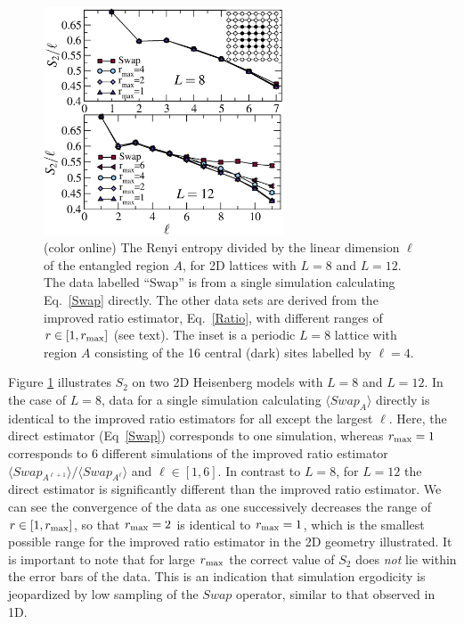 \documentclass[prl,aps,twocolumn,floatfix,amsmath,amssymb,superscriptaddress,tightenlines]{revtex4}
\begin{document}
\begin{figure} {
\includegraphics[width=2.8in]{L8n12_ratio.eps} \caption{(color online) 
\label{L16fig}
The Renyi entropy divided by the linear dimension $\ell$ of the entangled region $A$, for 2D lattices with $L=8$ and $L=12$.  The data labelled ``Swap'' is from a single simulation calculating Eq.~\eqref{Swap} directly.  The other
data sets are derived from the improved ratio estimator, Eq.~\eqref{Ratio}, with different ranges of $r \in [1,r_{\rm max}]$ (see text).  The inset 
is a periodic $L=8$ lattice with region $A$ consisting of the 16 central (dark) sites labelled by $\ell = 4$.
}
} \end{figure}

Figure \ref{L16fig} illustrates $S_2$ on two 2D Heisenberg models with  $L=8$ and  $L=12$.  In the case of $L=8$, data for a single 
simulation calculating $\langle Swap_A \rangle$ directly is identical to the improved ratio estimators for all except the largest $\ell$.  
Here, the direct estimator (Eq~\eqref{Swap}) corresponds to one simulation, whereas $r_{\rm max}=1$ corresponds to 6 different simulations of the improved ratio estimator ${\langle Swap_{A^{\ell+1}}\rangle}/{\langle Swap_{A^{\ell}}\rangle}$ and $\ell \in [1,6]$.
In contrast to $L=8$, for $L=12$ the direct estimator is significantly different than 
the improved ratio estimator.  We can see the convergence of the data as one successively decreases the range of $r \in [1,r_{\rm max}]$, 
so that $r_{\rm max}=2$ is identical to $r_{\rm max}=1$, which is the smallest possible range for the improved ratio estimator in the 2D geometry illustrated.  It is important to note that for large $r_{\rm max}$ the correct value of $S_2$ does {\it not} lie within the error bars of the data.  
This is an indication that simulation ergodicity is jeopardized by low sampling of the $Swap$ operator, similar to that observed in 1D.
\end{document}
